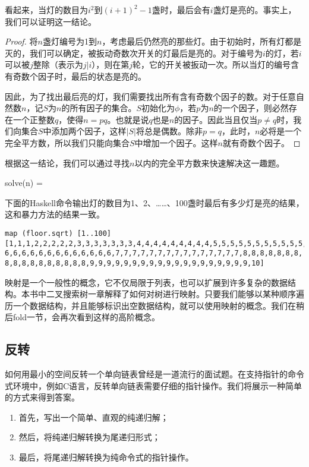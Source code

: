 \documentclass[UTF8]{article}
\begin{document}
看起来，当灯的数目为$i^2$到$(i+1)^2-1$盏时，最后会有$i$盏灯是亮的。事实上，我们可以证明这一结论。

\begin{proof}
将$n$盏灯编号为1到$n$，考虑最后仍然亮的那些灯。由于初始时，所有灯都是灭的，我们可以确定，被扳动奇数次开关的灯最后是亮的。对于编号为$i$的灯，若$i$可以被$j$整除（表示为$j | i$），则在第$j$轮，它的开关被扳动一次。所以当灯的编号含有奇数个因子时，最后的状态是亮的。

因此，为了找出最后亮的灯，我们需要找出所有含有奇数个因子的数。对于任意自然数$n$，记$S$为$n$的所有因子的集合。$S$初始化为$\phi$，若$p$为$n$的一个因子，则必然存在一个正整数$q$，使得$n = p q$。也就是说$q$也是$n$的因子。因此当且仅当$p \neq q$时，我们向集合$S$中添加两个因子，这样$|S|$将总是偶数。除非$p = q$，此时，$n$必将是一个完全平方数，所以我们只能向集合$S$中增加一个因子。这样$n$就有奇数个因子。
\end{proof}

根据这一结论，我们可以通过寻找$n$以内的完全平方数来快速解决这一趣题。

\be
solve(n) = \lfloor {} \rfloor
\ee

下面的Haskell命令输出灯的数目为1、2、……、100盏时最后有多少灯是亮的结果，这和暴力方法的结果一致。

\begin{lstlisting}
map (floor.sqrt) [1..100]
[1,1,1,2,2,2,2,2,3,3,3,3,3,3,3,4,4,4,4,4,4,4,4,4,5,5,5,5,5,5,5,5,5,5,5,
6,6,6,6,6,6,6,6,6,6,6,6,6,7,7,7,7,7,7,7,7,7,7,7,7,7,7,7,8,8,8,8,8,8,8,
8,8,8,8,8,8,8,8,8,8,9,9,9,9,9,9,9,9,9,9,9,9,9,9,9,9,9,9,9,10]
\end{lstlisting}

映射是一个一般性的概念，它不仅局限于列表，也可以扩展到许多复杂的数据结构。本书中二叉搜索树一章解释了如何对树进行映射。只要我们能够以某种顺序遍历一个数据结构，并且能够标识出空数据结构，就可以使用映射的概念。我们在稍后fold一节，会再次看到这样的高阶概念。

\subsection{反转}

如何用最小的空间反转一个单向链表曾经是一道流行的面试题。在支持指针的命令式环境中，例如C语言，反转单向链表需要仔细的指针操作。我们将展示一种简单的方式来得到答案。

\begin{enumerate}
\item 首先，写出一个简单、直观的纯递归解；
\item 然后，将纯递归解转换为尾递归形式；
\item 最后，将尾递归解转换为纯命令式的指针操作。
\end{enumerate}
\end{document}
